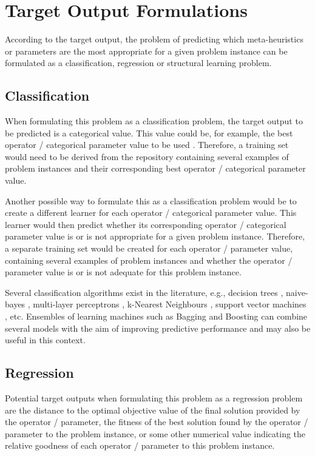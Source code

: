 \documentclass{article}
\begin{document}
\section{Target Output Formulations}
\label{sec:target-output}

According to the target output, the problem of predicting which meta-heuristics or parameters are the most appropriate for a given problem instance can be formulated as a classification, regression or structural learning problem.

\subsection{Classification}

When formulating this problem as a classification problem, the target output to be predicted is a categorical value. This value could be, for example, the best operator / categorical parameter value to be used \cite{Pappa2014}. Therefore, a training set would need to be derived from the repository containing several examples of problem instances and their corresponding best operator / categorical parameter value. 

Another possible way to formulate this as a classification problem would be to create a different learner for each operator / categorical parameter value. This learner would then predict whether its corresponding operator / categorical parameter value is or is not appropriate for a given problem instance. Therefore, a separate training set would be created for each operator / parameter value, containing several examples of problem instances and whether the operator / parameter value is or is not adequate for this problem instance.

Several classification algorithms exist in the literature, e.g., decision trees \cite{MenziesEtAl2014}, naive-bayes \cite{Bishop2006}, multi-layer perceptrons \cite{Bishop2006}, k-Nearest Neighbours \cite{MenziesEtAl2014}, support vector machines \cite{ShaweTaylor2000}, etc. Ensembles of learning machines such as Bagging \cite{Breiman1996} and Boosting \cite{Breiman1998} can combine several models with the aim of improving predictive performance and may also be useful in this context.

\subsection{Regression}

Potential target outputs when formulating this problem as a regression problem are the distance to the optimal objective value of the final solution provided by the operator / parameter, the fitness of the best solution found by the operator / parameter to the problem instance, or some other numerical value indicating the relative goodness of each operator / parameter to this problem instance. 
\end{document}
